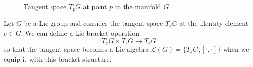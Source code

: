 \begin{figure}[htpb]
  \centering
  \def\svgwidth{0.55\columnwidth}
  
  \caption{Tangent space $T_p G$ at point $p$ in the manifold $G$.}
  \label{fig:tangentspace}
\end{figure}
\begin{claim}
  Let $G$ be a Lie group and consider the tangent space $T_e  G$ at the identity element $e \in G$.
  We can define a Lie bracket operation
  \begin{equation}
    [\cdot, \cdot]: T_e G \times T_e G \to T_e G
  \end{equation}
  so that the tangent space becomes a Lie algebra $\mathscr{L}(G) = \{T_e G, [\cdot , \cdot]\}$ when we equip it with this bracket structure.
\end{claim}

